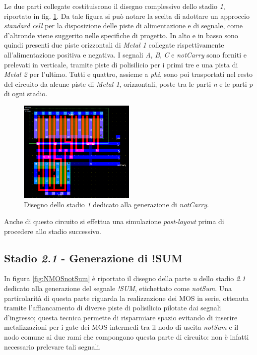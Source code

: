 Le due parti collegate costituiscono il disegno complessivo dello stadio \textit{1}, riportato in fig. \ref{fig:notCarry}. Da tale figura si può notare la scelta di adottare un approccio \textit{standard cell} per la disposizione delle piste di alimentazione e di segnale, come d'altronde viene suggerito nelle specifiche di progetto. In alto e in basso sono quindi presenti due piste orizzontali di \textit{Metal 1} collegate rispettivamente all'alimentazione positiva e negativa. I segnali \textit{A}, \textit{B}, \textit{C} e \textit{notCarry} sono forniti e prelevati in verticale, tramite piste di polisilicio per i primi tre e una pista di \textit{Metal 2} per l'ultimo. Tutti e quattro, assieme a \textit{phi}, sono poi trasportati nel resto del circuito da alcune piste di \textit{Metal 1}, orizzontali, poste tra le parti \textit{n} e le parti \textit{p} di ogni stadio.

\begin{figure}[hbt!]
	\centering
	\includegraphics[width=0.5\textwidth]{figure/Msk_NotCarry_V2.png}
	\caption{Disegno dello stadio \textit{1} dedicato alla generazione di \textit{notCarry}.}
	\label{fig:notCarry}
\end{figure} 

Anche di questo circuito si effettua una simulazione \textit{post-layout} prima di procedere allo stadio successivo.

\subsection{Stadio \textit{2.1} - Generazione di !SUM}

In figura \ref{fig:NMOSnotSum} è riportato il disegno della parte \textit{n} dello stadio \textit{2.1} dedicato alla generazione del segnale \textit{!SUM}, etichettato come \textit{notSum}. Una particolarità di questa parte riguarda la realizzazione dei MOS in serie, ottenuta tramite l'affiancamento di diverse piste di polisilicio pilotate dai segnali d'ingresso; questa tecnica permette di risparmiare spazio evitando di inserire metalizzazioni per i gate dei MOS intermedi tra il nodo di uscita \textit{notSum} e il nodo comune ai due rami che compongono questa parte di circuito: non è infatti necessario prelevare tali segnali.

